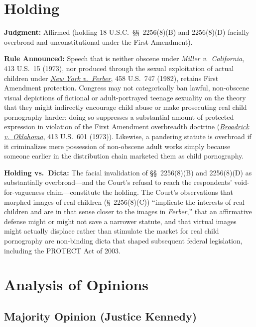 \documentclass[12pt]{article}
\begin{document}
\section{Holding}

\textbf{Judgment:} Affirmed (holding 18 U.S.C.\ \S\S~2256(8)(B) and 2256(8)(D) facially overbroad and unconstitutional under the First Amendment).

\textbf{Rule Announced:} Speech that is neither obscene under \textit{Miller v.\ California}, 413 U.S.\ 15 (1973), nor produced through the sexual exploitation of actual children under \href{https://supreme.justia.com/cases/federal/us/458/747/}{\textit{New York v.\ Ferber}}, 458 U.S.\ 747 (1982), retains First Amendment protection. Congress may not categorically ban lawful, non-obscene visual depictions of fictional or adult-portrayed teenage sexuality on the theory that they might indirectly encourage child abuse or make prosecuting real child pornography harder; doing so suppresses a substantial amount of protected expression in violation of the First Amendment overbreadth doctrine (\href{https://supreme.justia.com/cases/federal/us/413/601/}{\textit{Broadrick v.\ Oklahoma}}, 413 U.S.\ 601 (1973)). Likewise, a pandering statute is overbroad if it criminalizes mere possession of non-obscene adult works simply because someone earlier in the distribution chain marketed them as child pornography.

\textbf{Holding vs.\ Dicta:} The facial invalidation of \S\S~2256(8)(B) and 2256(8)(D) as substantially overbroad---and the Court's refusal to reach the respondents' void-for-vagueness claim---constitute the holding. The Court's observations that morphed images of real children (\S~2256(8)(C)) ``implicate the interests of real children and are in that sense closer to the images in \textit{Ferber},'' that an affirmative defense might or might not save a narrower statute, and that virtual images might actually displace rather than stimulate the market for real child pornography are non-binding dicta that shaped subsequent federal legislation, including the PROTECT Act of 2003.

\section{Analysis of Opinions}

\subsection{Majority Opinion (Justice Kennedy)}
\end{document}
